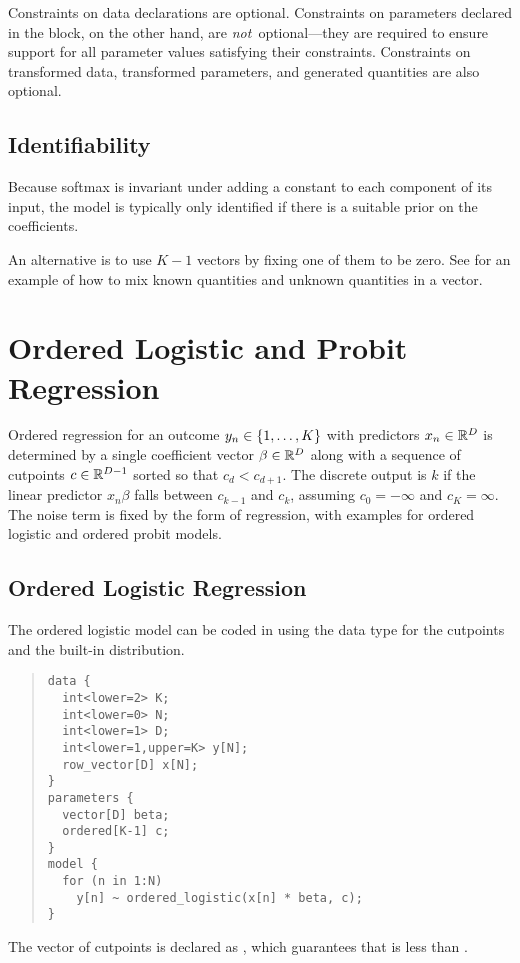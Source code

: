 Constraints on data declarations are optional.  Constraints on
parameters declared in the  block, on the other hand,
are {\it not}\ optional---they are required to ensure support for all
parameter values satisfying their constraints.  Constraints on
transformed data, transformed parameters, and generated quantities are
also optional.

\subsection{Identifiability}

Because softmax is invariant under adding a constant to each component
of its input, the model is typically only identified if there is a
suitable prior on the coefficients.

An alternative is to use $K-1$ vectors by fixing one of them to be
zero.  See  for an example of
how to mix known quantities and unknown quantities in a vector.


\section{Ordered Logistic and Probit Regression}\label{ordered-logistic.section}

Ordered regression for an outcome $y_n \in \{ 1,\ldots,K \}$ with
predictors $x_n \in \mathbb{R}^D$ is determined by a single coefficient
vector $\beta \in \mathbb{R}^D$ along with a sequence of cutpoints $c \in
\mathbb{R}^{D-1}$ sorted so that $c_d < c_{d+1}$.  The discrete output is
$k$ if the linear predictor $x_n \beta$ falls between $c_{k-1}$ and
$c_k$, assuming $c_0 = -\infty$ and $c_K = \infty$.  The noise term is
fixed by the form of regression, with examples for ordered logistic
and ordered probit models.  

\subsection{Ordered Logistic Regression}

The ordered logistic model can be coded in \Stan using the
 data type for the cutpoints and the built-in
 distribution.
%
\begin{quote}
\begin{Verbatim}[fontsize=\small]
data {
  int<lower=2> K;
  int<lower=0> N;
  int<lower=1> D;
  int<lower=1,upper=K> y[N];
  row_vector[D] x[N];
} 
parameters {
  vector[D] beta;
  ordered[K-1] c;
} 
model {
  for (n in 1:N)
    y[n] ~ ordered_logistic(x[n] * beta, c);
}
\end{Verbatim}
\end{quote}
% 
The vector of cutpoints  is declared as ,
which guarantees that  is less than . 

